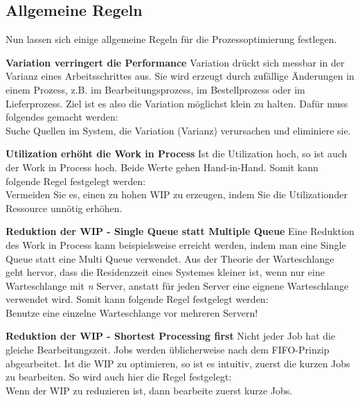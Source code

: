 \subsection{Allgemeine Regeln}
Nun lassen sich einige allgemeine Regeln für die Prozessoptimierung festlegen.
\newline

\textbf{Variation verringert die Performance} 
\newline
Variation drückt sich messbar in der Varianz eines Arbeitsschrittes aus. Sie wird erzeugt durch zufällige Änderungen in einem Prozess, z.B. im Bearbeitungsprozess, im Bestellprozess oder im Lieferprozess.
Ziel ist es also die Variation möglichst klein zu halten. Dafür muss folgendes gemacht werden:\\
\newline
 Suche Quellen im System, die Variation (Varianz) verursachen und eliminiere sie. \\
 \newline
 
 \textbf{Utilization erhöht die Work in Process }
 \newline
 Ist die Utilization hoch, so ist auch der Work in Process hoch. Beide Werte gehen Hand-in-Hand. Somit kann folgende Regel festgelegt werden: \\
 \newline
 Vermeiden Sie es, einen zu hohen WIP zu erzeugen, indem Sie die Utilizationder Ressource unnötig erhöhen. \\
 \newline 
 
 \textbf{Reduktion der WIP - Single Queue statt Multiple Queue }
 \newline
 Eine Reduktion des Work in Process kann beispielsweise erreicht werden, indem man eine Single Queue statt eine Multi Queue verwendet. Aus der Theorie der Warteschlange geht hervor, dass die Residenzzeit eines Systemes kleiner ist, wenn nur eine Warteschlange mit \textit{n} Server, anstatt für jeden Server eine eignene Warteschlange verwendet wird.  Somit kann folgende Regel festgelegt werden: \\
 
 Benutze eine einzelne Warteschlange vor mehreren Servern!\\
 \newline
 
\textbf{Reduktion der WIP - Shortest Processing first }
\newline
Nicht jeder Job hat die gleiche Bearbeitungszeit. Jobs werden üblicherweise nach dem FIFO-Prinzip abgearbeitet.
Ist die WIP zu optimieren, so ist es intuitiv, zuerst die kurzen Jobs zu bearbeiten.
So wird auch hier die Regel festgelegt:\\
Wenn der WIP zu reduzieren ist, dann bearbeite zuerst kurze Jobs.\\
 \newline

